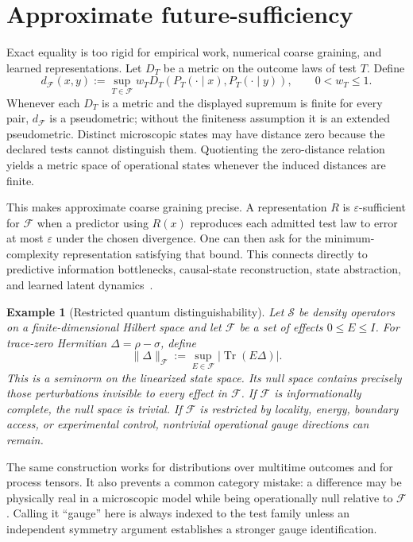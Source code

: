 \documentclass[11pt]{article}
\newtheorem{example}[definition]{Example}
\newcommand{\F}{\mathcal F}
\newcommand{\Sspace}{\mathcal S}
\newcommand{\Tr}{\operatorname{Tr}}
\newcommand{\eps}{\varepsilon}
\begin{document}
\section{Approximate future-sufficiency}
\label{sec:metric}

Exact equality is too rigid for empirical work, numerical coarse graining, and learned representations. Let $D_T$ be a metric on the outcome laws of test $T$. Define
\begin{equation}
  d_{\F}(x,y)
  :=
  \sup_{T\in\F} w_T
  D_T\!\left(P_T(\cdot\mid x),P_T(\cdot\mid y)\right),
  \qquad 0<w_T\le 1.
  \label{eq:pseudometric}
\end{equation}
Whenever each $D_T$ is a metric and the displayed supremum is finite for every pair, $d_{\F}$ is a pseudometric; without the finiteness assumption it is an extended pseudometric. Distinct microscopic states may have distance zero because the declared tests cannot distinguish them. Quotienting the zero-distance relation yields a metric space of operational states whenever the induced distances are finite.

This makes approximate coarse graining precise. A representation $R$ is $\eps$-sufficient for $\F$ when a predictor using $R(x)$ reproduces each admitted test law to error at most $\eps$ under the chosen divergence. One can then ask for the minimum-complexity representation satisfying that bound. This connects directly to predictive information bottlenecks, causal-state reconstruction, state abstraction, and learned latent dynamics~\cite{shalizi2001,creutzig2009,givan2003,ferns2011}.

\begin{example}[Restricted quantum distinguishability]
Let $\Sspace$ be density operators on a finite-dimensional Hilbert space and let $\F$ be a set of effects $0\le E\le I$. For trace-zero Hermitian $\Delta=\rho-\sigma$, define
\begin{equation}
  \|\Delta\|_{\F}
  :=
  \sup_{E\in\F}\left|\Tr(E\Delta)\right|.
  \label{eq:restricted-qnorm}
\end{equation}
This is a seminorm on the linearized state space. Its null space contains precisely those perturbations invisible to every effect in $\F$. If $\F$ is informationally complete, the null space is trivial. If $\F$ is restricted by locality, energy, boundary access, or experimental control, nontrivial operational gauge directions can remain.
\end{example}

The same construction works for distributions over multitime outcomes and for process tensors. It also prevents a common category mistake: a difference may be physically real in a microscopic model while being operationally null relative to $\F$. Calling it ``gauge'' here is always indexed to the test family unless an independent symmetry argument establishes a stronger gauge identification.
\end{document}
